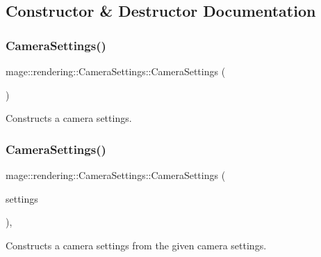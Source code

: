 \subsection{Constructor \& Destructor Documentation}
\hypertarget{classmage_1_1rendering_1_1_camera_settings_a46be4ca54bacf2597672a2e944f9fef6}{}\label{classmage_1_1rendering_1_1_camera_settings_a46be4ca54bacf2597672a2e944f9fef6} 
\subsubsection{\texorpdfstring{Camera\+Settings()}{CameraSettings()}\hspace{0.1cm}{\footnotesize\ttfamily [1/3]}}
{\footnotesize\ttfamily mage\+::rendering\+::\+Camera\+Settings\+::\+Camera\+Settings (\begin{DoxyParamCaption}{ }\end{DoxyParamCaption})\hspace{0.3cm}{\ttfamily [noexcept]}}

Constructs a camera settings. \hypertarget{classmage_1_1rendering_1_1_camera_settings_af0501d9365b74ce296a517b40a13e81e}{}\label{classmage_1_1rendering_1_1_camera_settings_af0501d9365b74ce296a517b40a13e81e} 
\subsubsection{\texorpdfstring{Camera\+Settings()}{CameraSettings()}\hspace{0.1cm}{\footnotesize\ttfamily [2/3]}}
{\footnotesize\ttfamily mage\+::rendering\+::\+Camera\+Settings\+::\+Camera\+Settings (\begin{DoxyParamCaption}\item[{const \hyperlink{classmage_1_1rendering_1_1_camera_settings}{Camera\+Settings} \&}]{settings }\end{DoxyParamCaption})\hspace{0.3cm}{\ttfamily [default]}, {\ttfamily [noexcept]}}

Constructs a camera settings from the given camera settings.


